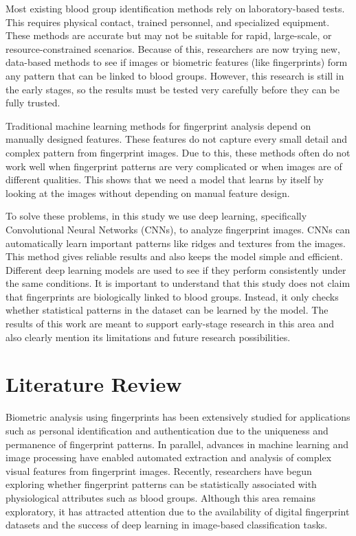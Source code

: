 \documentclass[conference]{IEEEtran}
\begin{document}
Most existing blood group identification methods rely on laboratory-based tests. This requires physical contact, trained personnel, and specialized equipment. These methods are accurate but may not be suitable for rapid, large-scale, or resource-constrained scenarios. Because of this, researchers are now trying new, data-based methods to see if images or biometric features (like fingerprints) form any pattern that can be linked to blood groups. However, this research is still in the early stages, so the results must be tested very carefully before they can be fully trusted.

Traditional machine learning methods for fingerprint analysis depend on manually designed features. These features do not capture every small detail and complex pattern from fingerprint images. Due to this, these methods often do not work well when fingerprint patterns are very complicated or when images are of different qualities. This shows that we need a model that learns by itself by looking at the images without depending on manual feature design.

To solve these problems, in this study we use deep learning, specifically Convolutional Neural Networks (CNNs), to analyze fingerprint images. CNNs can automatically learn important patterns like ridges and textures from the images. This method gives reliable results and also keeps the model simple and efficient. Different deep learning models are used to see if they perform consistently under the same conditions. It is important to understand that this study does not claim that fingerprints are biologically linked to blood groups. Instead, it only checks whether statistical patterns in the dataset can be learned by the model. The results of this work are meant to support early-stage research in this area and also clearly mention its limitations and future research possibilities.

\section{Literature Review}
Biometric analysis using fingerprints has been extensively studied for applications such as personal identification and authentication due to the uniqueness and permanence of fingerprint patterns. In parallel, advances in machine learning and image processing have enabled automated extraction and analysis of complex visual features from fingerprint images. Recently, researchers have begun exploring whether fingerprint patterns can be statistically associated with physiological attributes such as blood groups. Although this area remains exploratory, it has attracted attention due to the availability of digital fingerprint datasets and the success of deep learning in image-based classification tasks.
\end{document}
